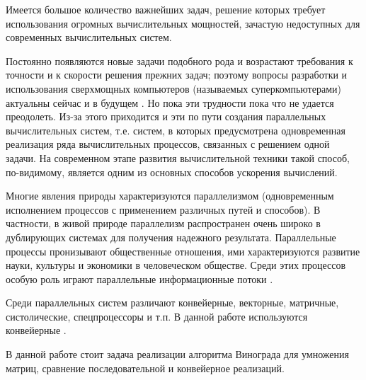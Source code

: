 \newpage
{}

Имеется большое количество важнейших задач, решение которых требует использования огромных вычислительных мощностей,
зачастую недоступных для современных вычислительных систем.

Постоянно появляются новые задачи подобного рода и возрастают требования к точности и к скорости решения прежних задач;
поэтому вопросы разработки и использования сверхмощных компьютеров (называемых суперкомпьютерами) актуальны сейчас и в
будущем \cite{Voevodin}. Но пока эти трудности пока что не удается преодолеть. Из-за этого приходится и эти по пути
создания параллельных вычислительных систем, т.е. систем, в которых предусмотрена одновременная реализация ряда
вычислительных процессов, связанных с решением одной задачи. \cite{Korneev} На современном этапе развития вычислительной
техники такой способ, по-видимому, является одним из основных способов ускорения вычислений.

Многие явления природы характеризуются параллелизмом (одновременным исполнением процессов с применением различных путей и
способов). В частности, в живой природе параллелизм распространен очень широко в дублирующих системах для получения
надежного результата. Параллельные процессы пронизывают общественные отношения, ими характеризуются развитие науки,
культуры и экономики в человеческом обществе. Среди этих процессов особую роль играют параллельные информационные потоки \cite{Conveer}.

Среди параллельных систем различают конвейерные, векторные, матричные, систолические, спецпроцессоры и т.п. В данной
работе используются конвейерные \cite{Korneev}.

В данной работе стоит задача реализации алгоритма Винограда для умножения матриц, сравнение последовательной и
конвейерное реализаций.
